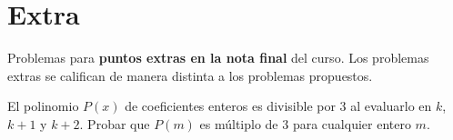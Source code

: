 \section{Extra}

Problemas para \textbf{puntos extras en la nota final} del curso.
Los problemas extras se califican de manera distinta a los problemas propuestos.

\begin{problem}
    El polinomio $P(x)$ de coeficientes enteros es divisible por 3 al evaluarlo en $k$, $k + 1$ y $k + 2$.
    Probar que $P(m)$ es múltiplo de 3 para cualquier entero $m$.
\end{problem}
